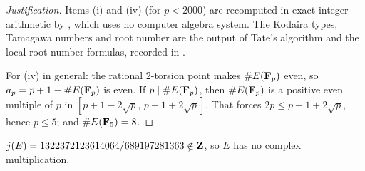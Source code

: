 \begin{proof}[Justification]
Items (i) and (iv) (for $p<2000$) are recomputed in exact integer arithmetic by , which uses no computer algebra system. The Kodaira types, Tamagawa numbers and root number are the output of Tate's algorithm and the local root-number formulas, recorded in .

For (iv) in general: the rational $2$-torsion point makes $\#E(\mathbf{F}_p)$ even, so $a_p=p+1-\#E(\mathbf{F}_p)$ is even. If $p\mid\#E(\mathbf{F}_p)$, then $\#E(\mathbf{F}_p)$ is a positive even multiple of $p$ in $[p+1-2\sqrt p,\,p+1+2\sqrt p]$. That forces $2p\le p+1+2\sqrt p$, hence $p\le5$; and $\#E(\mathbf{F}_5)=8$.
\end{proof}

\begin{proposition}\label{prop:noncm}
$j(E)=1322372123614064/689197281363\notin\mathbf{Z}$, so $E$ has no complex multiplication.
\end{proposition}

